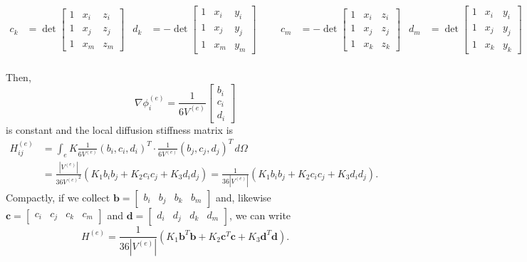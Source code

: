 \documentclass[hidelinks]{article}
\begin{document}
{{\begin{align*}
c_k &= \det \begin{bmatrix} 1 & x_i & z_i \\ 1 & x_j & z_j \\ 1 & x_m & z_m \end{bmatrix}& d_k &= - \det \begin{bmatrix} 1 & x_i & y_i \\ 1 & x_j & y_j \\ 1 & x_m & y_m \end{bmatrix}     & & & c_m &= - \det \begin{bmatrix} 1 & x_i & z_i \\ 1 & x_j & z_j \\ 1 & x_k & z_k \end{bmatrix}& d_m &=\det \begin{bmatrix} 1 & x_i & y_i \\ 1 & x_j & y_j \\ 1 & x_k & y_k \end{bmatrix}\\
\end{align*}
}
}

Then, \[\nabla \phi_i^{(e)} = \frac{1}{6V^{(e)}}\begin{bmatrix}
    b_i \\ c_i \\ d_i
\end{bmatrix} \] is constant and the local diffusion stiffness matrix is 
\begin{align*}
H_{ij}^{(e)} &= \int_e K \frac{1}{6V^{(e)}}(b_i, c_i, d_i)^T \cdot \frac{1}{6V^{(e)}}(b_j, c_j, d_j)^T \,d\Omega \\ &= \frac{|V^{(e)}|}{{36V^{(e)}}^2} (K_1b_ib_j + K_2c_ic_j + K_3d_id_j) = \frac{1}{36|V^{(e)}|} (K_1b_ib_j + K_2c_ic_j + K_3d_id_j).
\end{align*}
Compactly, if we collect $\mathbf{b} = \begin{bmatrix} b_i & b_j & b_k & b_m\end{bmatrix}$ and, likewise $\mathbf{c} = \begin{bmatrix} c_i & c_j & c_k & c_m\end{bmatrix}$ and $\mathbf{d} = \begin{bmatrix} d_i & d_j & d_k & d_m \end{bmatrix}$, we can write 
\[ H^{(e)} = \frac{1}{36|V^{(e)}|}(K_1\mathbf{b}^T\mathbf{b} + K_2\mathbf{c}^T\mathbf{c} +  K_3\mathbf{d}^T\mathbf{d}).
\]
\end{document}
